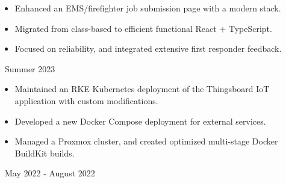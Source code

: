 \documentclass[11pt,letterpaper,ragged2e]{altacv}
\begin{document}
\tagline{}

\hfuzz=5pt %

\begin{fullwidth}
  \makecvheader
\end{fullwidth}




{
  \begin{itemize}
    \item Enhanced an EMS/firefighter job submission page with a modern stack.
    \item Migrated from class-based to efficient functional React + TypeScript.
    \item Focused on reliability, and integrated extensive first responder feedback.
  \end{itemize}
}
{\faCalendar\, Summer 2023}
{
}


{
  \begin{itemize}
    \item Maintained an RKE Kubernetes deployment of the Thingsboard IoT application with custom modifications.
    \item Developed a new Docker Compose deployment for external services.
    \item Managed a Proxmox cluster, and created optimized multi-stage Docker BuildKit builds.
  \end{itemize}
}
{\faCalendar\, May 2022 - August 2022}
{
}
\end{document}

